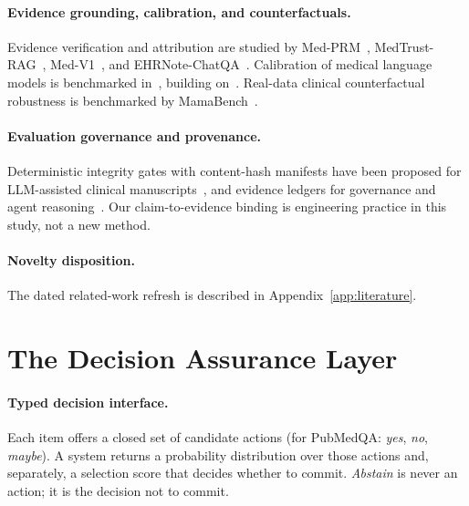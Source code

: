 \documentclass[11pt]{article}
\begin{document}
\paragraph{Evidence grounding, calibration, and counterfactuals.}
Evidence verification and attribution are studied by Med-PRM~\citep{yun2025medprm}, MedTrust-RAG~\citep{arxiv2510_14400},
Med-V1~\citep{arxiv2603_05308}, and EHRNote-ChatQA~\citep{arxiv2606_15735}. Calibration of medical language models is
benchmarked in~\citep{arxiv2506_10769,boie2026calibration}, building on~\citep{guo2017calibration,gneiting2007proper}. Real-data
clinical counterfactual robustness is benchmarked by MamaBench~\citep{arxiv2607_14385}.

\paragraph{Evaluation governance and provenance.}
Deterministic integrity gates with content-hash manifests have been proposed for LLM-assisted clinical
manuscripts~\citep{arxiv2606_09500}, and evidence ledgers for governance and agent reasoning~\citep{arxiv2607_05410,arxiv2607_28374}.
Our claim-to-evidence binding is engineering practice in this study, not a new method.

\paragraph{Novelty disposition.}
The dated related-work refresh is described in Appendix~\ref{app:literature}.

\section{The Decision Assurance Layer}
\label{sec:method}

\paragraph{Typed decision interface.}
Each item offers a closed set of candidate actions (for PubMedQA: \emph{yes}, \emph{no}, \emph{maybe}).
A system returns a probability distribution over those actions and, separately, a selection score that
decides whether to commit. \emph{Abstain} is never an action; it is the decision not to commit.
\end{document}

